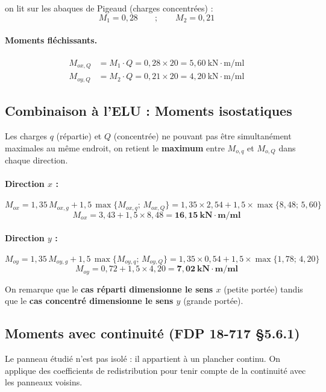on lit sur les abaques de Pigeaud (charges concentrées) :
\[
  M_1 = 0{,}28 \qquad ; \qquad M_2 = 0{,}21
\]

\paragraph{Moments fléchissants.}
\[
\begin{aligned}
  M_{ox,Q} &= M_1 \cdot Q = 0{,}28 \times 20 = 5{,}60~\text{kN}\cdot\text{m/ml} \\
  M_{oy,Q} &= M_2 \cdot Q = 0{,}21 \times 20 = 4{,}20~\text{kN}\cdot\text{m/ml}
\end{aligned}
\]

\subsection{Combinaison à l'ELU : Moments isostatiques}

Les charges $q$ (répartie) et $Q$ (concentrée) ne pouvant pas être simultanément maximales au même endroit, on retient le \textbf{maximum} entre $M_{o,q}$ et $M_{o,Q}$ dans chaque direction.

\paragraph{Direction $x$ :}
\[
  M_{ox} = 1{,}35\,M_{ox,g} + 1{,}5\,\max\{M_{ox,q} ;\, M_{ox,Q}\}
         = 1{,}35 \times 2{,}54 + 1{,}5 \times \max\{8{,}48 ;\, 5{,}60\}
\]
\[
  M_{ox} = 3{,}43 + 1{,}5 \times 8{,}48 = \mathbf{16{,}15~\text{kN}\cdot\text{m/ml}}
\]

\paragraph{Direction $y$ :}
\[
  M_{oy} = 1{,}35\,M_{oy,g} + 1{,}5\,\max\{M_{oy,q} ;\, M_{oy,Q}\}
         = 1{,}35 \times 0{,}54 + 1{,}5 \times \max\{1{,}78 ;\, 4{,}20\}
\]
\[
  M_{oy} = 0{,}72 + 1{,}5 \times 4{,}20 = \mathbf{7{,}02~\text{kN}\cdot\text{m/ml}}
\]

On remarque que le \textbf{cas réparti dimensionne le sens $x$} (petite portée) tandis que le \textbf{cas concentré dimensionne le sens $y$} (grande portée).

\subsection{Moments avec continuité (FDP 18-717 §5.6.1)}

Le panneau étudié n'est pas isolé : il appartient à un plancher continu. On applique des coefficients de redistribution pour tenir compte de la continuité avec les panneaux voisins.

